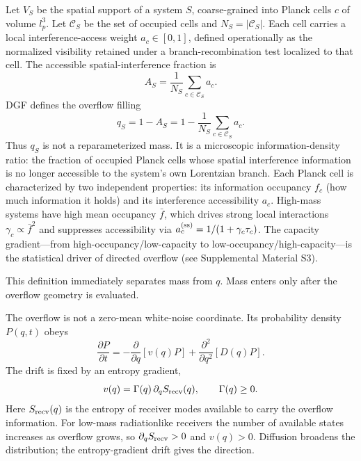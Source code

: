\documentclass[aps,prl,twocolumn,superscriptaddress,nofootinbib,floatfix]{revtex4-2}
\begin{document}
Let $V_S$ be the spatial support of a system $S$, coarse-grained into Planck cells $c$ of volume $l_p^3$. Let $\mathcal C_S$ be the set of occupied cells and $N_S=|\mathcal C_S|$. Each cell carries a local interference-access weight $a_c\in[0,1]$, defined operationally as the normalized visibility retained under a branch-recombination test localized to that cell. The accessible spatial-interference fraction is
\begin{equation}
A_S=\frac{1}{N_S}\sum_{c\in\mathcal C_S}a_c .
\end{equation}
DGF defines the overflow filling
\begin{equation}
\boxed{q_S=1-A_S
=1-\frac{1}{N_S}\sum_{c\in\mathcal C_S}a_c.}
\end{equation}
Thus $q_S$ is not a reparameterized mass. It is a microscopic information-density ratio: the fraction of occupied Planck cells whose spatial interference information is no longer accessible to the system's own Lorentzian branch. Each Planck cell is characterized by two independent properties: its information occupancy $f_c$ (how much information it holds) and its interference accessibility $a_c$. High-mass systems have high mean occupancy $\bar{f}$, which drives strong local interactions $\gamma_c\propto\bar{f}^2$ and suppresses accessibility via $a_c^{\rm(ss)}=1/(1+\gamma_c\tau_c)$. The capacity gradient---from high-occupancy/low-capacity to low-occupancy/high-capacity---is the statistical driver of directed overflow (see Supplemental Material S3).

This definition immediately separates mass from $q$. Mass enters only after the overflow geometry is evaluated.

The overflow is not a zero-mean white-noise coordinate. Its probability density $P(q,t)$ obeys
\begin{equation}
\boxed{
\frac{\partial P}{\partial t}
=-\frac{\partial}{\partial q}\!\left[v(q)P\right]
+\frac{\partial^2}{\partial q^2}\!\left[D(q)P\right].
}
\end{equation}
The drift is fixed by an entropy gradient,
\begin{equation}
v(q)=\Gamma(q)\,\partial_q S_{\rm recv}(q),
\qquad
\Gamma(q)\ge0 .
\end{equation}
Here $S_{\rm recv}(q)$ is the entropy of receiver modes available to carry the overflow information. For low-mass radiationlike receivers the number of available states increases as overflow grows, so $\partial_qS_{\rm recv}>0$ and $v(q)>0$. Diffusion broadens the distribution; the entropy-gradient drift gives the direction.
\end{document}
